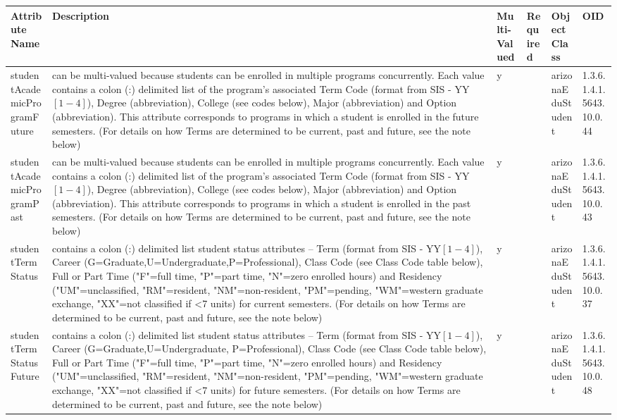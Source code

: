 \documentclass[12pt,notitlepage]{article}
\begin{document}
{\begin{tabular}{|p{3cm}|p{4cm}|p{0.7cm}|p{1cm}|l|l|}
\hline
\textbf{Attribute Name}& \textbf{Description} & \textbf{Multi-Valued} 
& \textbf{Required} & \textbf{ObjectClass} & \textbf{OID} \\
\hline
studentAcademicProgramFuture & can be multi-valued because students can be enrolled in multiple 
programs concurrently. Each value contains a colon (:) delimited list of the program's 
associated Term Code (format from SIS - YY$\left[1-4\right]$), Degree (abbreviation), 
College (see codes below), Major (abbreviation) and Option (abbreviation). This attribute 
corresponds to programs in which a student is enrolled in the future semesters. (For details 
on how Terms are determined to be current, past and future, see the note below) & y & & arizonaEduStudent & 1.3.6.1.4.1.5643.10.0.44\\ 
\hline
studentAcademicProgramPast & can be multi-valued because students can be enrolled in multiple 
programs concurrently. Each value contains a colon (:) delimited list of the program's 
associated Term Code (format from SIS - YY$\left[1-4\right]$), Degree (abbreviation), College 
(see codes below), Major (abbreviation) and Option (abbreviation). This attribute corresponds 
to programs in which a student is enrolled in the past semesters. (For details on how Terms are 
determined to be current, past and future, see the note below) & y & & arizonaEduStudent & 1.3.6.1.4.1.5643.10.0.43\\
\hline
studentTermStatus & contains a colon (:) delimited list student status attributes -- Term 
(format from SIS - YY$\left[1-4\right]$), Career (G=Graduate,U=Undergraduate,P=Professional), 
Class Code (see Class Code table below), Full or Part Time ("F"=full time, "P"=part time, 
"N"=zero enrolled hours) and Residency ("UM"=unclassified, "RM"=resident, "NM"=non-resident, 
"PM"=pending, "WM"=western graduate exchange, "XX"=not classified if <7 units) for current 
semesters. (For details on how Terms are determined to be current, past and future, see the 
note below) & y & & arizonaEduStudent & 1.3.6.1.4.1.5643.10.0.37 \\
\hline
studentTermStatusFuture & contains a colon (:) delimited list student status attributes -- 
Term (format from SIS - YY$\left[1-4\right]$), Career (G=Graduate,U=Undergraduate,
P=Professional), Class Code (see Class Code table below), Full or Part Time ("F"=full time, 
"P"=part time, "N"=zero enrolled hours) and Residency ("UM"=unclassified, "RM"=resident, 
"NM"=non-resident, "PM"=pending, "WM"=western graduate exchange, "XX"=not classified if <7 
units) for future semesters. (For details on how Terms are determined to be current, past and 
future, see the note below) & y & & arizonaEduStudent & 1.3.6.1.4.1.5643.10.0.48\\
\hline
\end{tabular}

}
\end{document}
